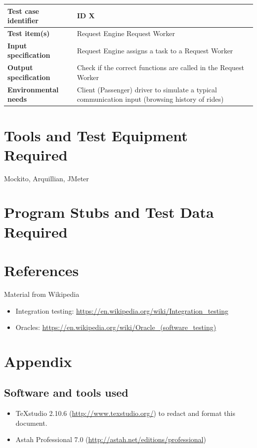 \documentclass[a4paper,11pt]{report} %
\begin{document}
		\bigskip	
		\begin{center}
			\renewcommand{\arraystretch}{1.2}
			\setlength{\tabcolsep}{24pt}
			\begin{tabular}{ l  p{9cm}}\hline
				\textbf{Test case identifier} & ID X\\\hline
				\textbf{Test item(s)} & Request Engine \textrightarrow Request Worker\\\hline
				\textbf{Input specification} & Request Engine assigns a task to a Request Worker \\\hline
				\textbf{Output specification} & Check if the correct functions are called in the Request Worker\\\hline
				\textbf{Environmental needs} & Client (Passenger) driver to simulate a typical communication input (browsing history of rides)\\\hline
			\end{tabular}
		\end{center}			
	
	
	\section{Tools and Test Equipment Required}
		Mockito, Arquillian, JMeter
	
	
	\section{Program Stubs and Test Data Required}
	
	\pagebreak
	\section{References}
		Material from Wikipedia
		\begin{itemize}
			\item Integration testing: \href{https://en.wikipedia.org/wiki/Integration_testing}{https://en.wikipedia.org/wiki/Integration\_testing}
			\item Oracles: \href{https://en.wikipedia.org/wiki/Oracle_(software_testing)}{https://en.wikipedia.org/wiki/Oracle\_(software\_testing)}
		\end{itemize}
	
	\section{Appendix}
	
	\subsection{Software and tools used}
	\begin{itemize}
		\item TeXstudio 2.10.6 (\href{http://www.texstudio.org/}{http://www.texstudio.org/}) to redact and format this document.
		\item Astah Professional 7.0 (\href{http://astah.net/editions/professional}{http://astah.net/editions/professional}) 
	\end{itemize}
	
\end{document}
